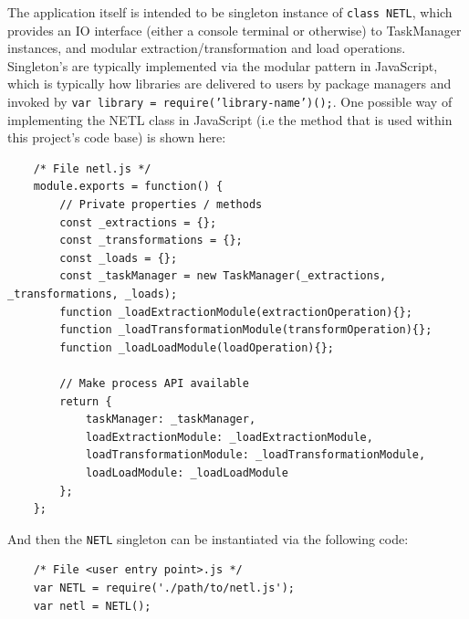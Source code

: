 The application itself is intended to be singleton instance of \texttt{class NETL{}}, which provides an IO interface (either a console terminal or otherwise) to TaskManager instances, and modular extraction/transformation and load operations. Singleton's are typically implemented via the modular pattern in JavaScript, which is typically how libraries are delivered to users by package managers and invoked by \texttt{var library = require('library-name')();}. One possible way of implementing the NETL class in JavaScript (i.e the method that is used within this project's code base) is shown here:

\begin{verbatim}
    /* File netl.js */
    module.exports = function() {
        // Private properties / methods
        const _extractions = {};
        const _transformations = {};
        const _loads = {};        
        const _taskManager = new TaskManager(_extractions, _transformations, _loads);
        function _loadExtractionModule(extractionOperation){};
        function _loadTransformationModule(transformOperation){};
        function _loadLoadModule(loadOperation){};

        // Make process API available
        return {
            taskManager: _taskManager,
            loadExtractionModule: _loadExtractionModule,
            loadTransformationModule: _loadTransformationModule,
            loadLoadModule: _loadLoadModule
        };
    };
\end{verbatim}

And then the \texttt{NETL} singleton can be instantiated via the following code:

\begin{verbatim}
    /* File <user entry point>.js */
    var NETL = require('./path/to/netl.js');
    var netl = NETL();
\end{verbatim}

